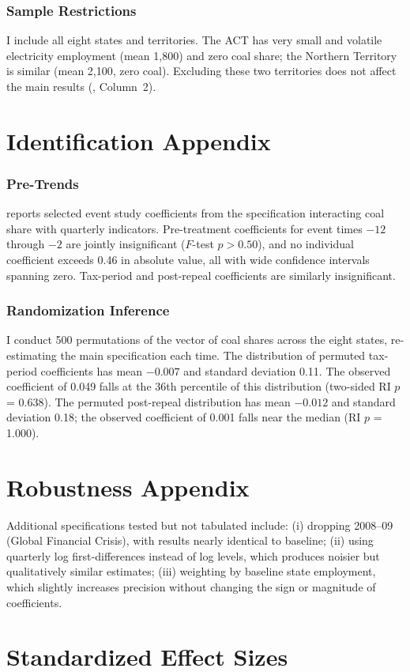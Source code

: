 \documentclass[12pt]{article}
\begin{document}
\subsubsection*{Sample Restrictions} I include all eight states and territories. The ACT has very small and volatile electricity employment (mean 1,800) and zero coal share; the Northern Territory is similar (mean 2,100, zero coal). Excluding these two territories does not affect the main results (, Column~2).

\section{Identification Appendix}

\subsubsection*{Pre-Trends}  reports selected event study coefficients from the specification interacting coal share with quarterly indicators. Pre-treatment coefficients for event times $-12$ through $-2$ are jointly insignificant ($F$-test $p > 0.50$), and no individual coefficient exceeds 0.46 in absolute value, all with wide confidence intervals spanning zero. Tax-period and post-repeal coefficients are similarly insignificant.



\subsubsection*{Randomization Inference} I conduct 500 permutations of the vector of coal shares across the eight states, re-estimating the main specification each time. The distribution of permuted tax-period coefficients has mean $-0.007$ and standard deviation 0.11. The observed coefficient of 0.049 falls at the 36th percentile of this distribution (two-sided RI $p$ = 0.638). The permuted post-repeal distribution has mean $-0.012$ and standard deviation 0.18; the observed coefficient of 0.001 falls near the median (RI $p$ = 1.000).

\section{Robustness Appendix}

Additional specifications tested but not tabulated include: (i) dropping 2008--09 (Global Financial Crisis), with results nearly identical to baseline; (ii) using quarterly log first-differences instead of log levels, which produces noisier but qualitatively similar estimates; (iii) weighting by baseline state employment, which slightly increases precision without changing the sign or magnitude of coefficients.

\section{Standardized Effect Sizes}
\label{sec:sde}


\end{document}
